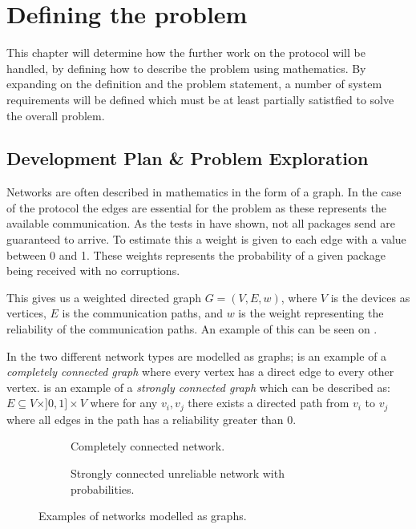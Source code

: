 \chapter{Defining the problem}
This chapter will determine how the further work on the protocol will be handled, by defining how to describe the problem using mathematics. 
By expanding on the definition and the problem statement, a number of system requirements will be defined which must be at least partially satistfied to solve the overall problem.


\section{Development Plan \& Problem Exploration}\label{chp:Problems}
Networks are often described in mathematics in the form of a graph. 
In the case of the protocol the edges are essential for the problem as these represents the available communication.
As the tests in  have shown, not all packages send are guaranteed to arrive.
To estimate this a weight is given to each edge with a value between 0 and 1.
These weights represents the probability of a given package being received with no corruptions.

This gives us a weighted directed graph $G = (V, E, w)$, where $V$ is the devices as vertices, $E$ is the communication paths, and $w$ is the weight representing the reliability of the communication paths.
An example of this can be seen on .

In  the two different network types are modelled as graphs; 
 is an example of a \emph{completely connected graph} where every vertex has a direct edge to every other vertex.
 is an example of a \emph{strongly connected graph} which can be described as: $E \subseteq V \times ]0,1] \times V$ where for any $v_i, v_j$ there exists a directed path from $v_i$ to $v_j$ where all edges in the path has a reliability greater than 0.

\begin{figure}[h]
    \begin{subfigure}{0.5\linewidth}
        \centering
        
        \caption{Completely connected network.}
        \label{fig:ccrcnetworkgraph}
    \end{subfigure}\hfill
    \begin{subfigure}{0.5\linewidth}
        \centering
        
        \caption{Strongly connected unreliable network with probabilities.}
        \label{fig:network}
    \end{subfigure}
    \caption{Examples of networks modelled as graphs.}
    \label{fig:examplenetworkgraphs} 
\end{figure}

